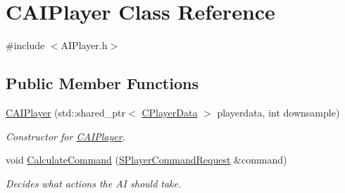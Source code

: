 \hypertarget{classCAIPlayer}{}\section{C\+A\+I\+Player Class Reference}
\label{classCAIPlayer}


{\ttfamily \#include $<$A\+I\+Player.\+h$>$}

\subsection*{Public Member Functions}
\begin{DoxyCompactItemize}
\item 
\hyperlink{classCAIPlayer_ab8b156d5fdce4d5ecf24624523fe5337}{C\+A\+I\+Player} (std\+::shared\+\_\+ptr$<$ \hyperlink{classCPlayerData}{C\+Player\+Data} $>$ playerdata, int downsample)
\begin{DoxyCompactList}\small\item\em Constructor for \hyperlink{classCAIPlayer}{C\+A\+I\+Player}. \end{DoxyCompactList}\item 
void \hyperlink{classCAIPlayer_ae2742efd250c7d6c00b659ccc29c4be3}{Calculate\+Command} (\hyperlink{structSPlayerCommandRequest}{S\+Player\+Command\+Request} \&command)
\begin{DoxyCompactList}\small\item\em Decides what actions the AI should take. \end{DoxyCompactList}\end{DoxyCompactItemize}
